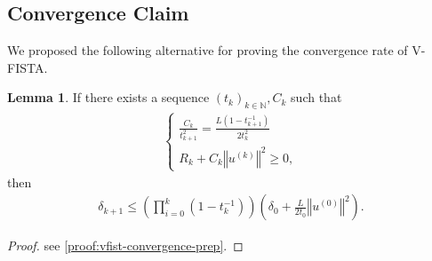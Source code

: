 \documentclass[]{article}
\theoremstyle{definition}
\newtheorem{lemma}{Lemma}[subsection]  %
\numberwithin{equation}{subsection}
\begin{document}
    \subsection{Convergence Claim}
        We proposed the following alternative for proving the convergence rate of V-FISTA. 
        \begin{lemma}\label{lemma:convergence-prep}
            If there exists a sequence $(t_k)_{k\in \mathbb N}, C_k$ such that 
            \begin{align}
                \begin{cases}
                    \frac{C_k}{t_{k + 1}^2} = \frac{L(1 - t^{-1}_{k + 1})}{2t_{k}^2}
                    \\
                    R_k + C_k\left\Vert
                        u^{(k)}
                    \right\Vert^2 \ge 0, 
                \end{cases}
            \end{align}
            then 
            \begin{align*}
                \delta_{k + 1}
                \le 
                \left(
                    \prod_{i = 0}^{k} (1 - t_k^{-1})
                \right)\left(
                    \delta_0 + \frac{L}{2t_0}\left\Vert
                        u^{(0)}
                    \right\Vert^2
                \right). 
            \end{align*}
        \end{lemma}
        \begin{proof}
            see \hyperref[proof:vfist-convergence-prep]{\ref*{proof:vfist-convergence-prep}}.    
        \end{proof}
        
\end{document}
